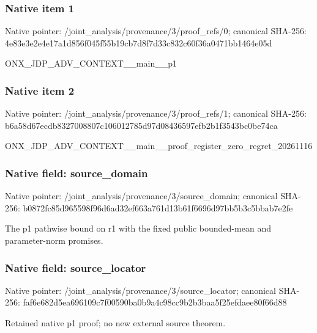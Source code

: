 \documentclass[10pt,a4paper]{article}
\begin{document}
\subsubsection{Native item 1}
Native pointer: /joint\_\allowbreak{}analysis/provenance/3/proof\_\allowbreak{}refs/0; canonical SHA-256: 4e83e3e2e4e17a1d856f045f55b19cb7d8f7d33c832c60f36a0471bb1464e05d

\begingroup\raggedright\sloppy ONX\_\allowbreak{}JDP\_\allowbreak{}ADV\_\allowbreak{}CONTEXT\_\allowbreak{}\_\allowbreak{}main\_\allowbreak{}\_\allowbreak{}p1\par\endgroup

\subsubsection{Native item 2}
Native pointer: /joint\_\allowbreak{}analysis/provenance/3/proof\_\allowbreak{}refs/1; canonical SHA-256: b6a58d67ecdb8327008807c106012785d97d08436597efb2b1f3543bc0be74ca

\begingroup\raggedright\sloppy ONX\_\allowbreak{}JDP\_\allowbreak{}ADV\_\allowbreak{}CONTEXT\_\allowbreak{}\_\allowbreak{}main\_\allowbreak{}\_\allowbreak{}proof\_\allowbreak{}register\_\allowbreak{}zero\_\allowbreak{}regret\_\allowbreak{}20261116\par\endgroup

\subsubsection{Native field: source\_\allowbreak{}domain}
Native pointer: /joint\_\allowbreak{}analysis/provenance/3/source\_\allowbreak{}domain; canonical SHA-256: b0872fc85d965598f96d6ad32ef663a761d13b61f6696d97bb5b3c5bbab7e2fe

\begingroup\raggedright\sloppy The p1 pathwise bound on r1 with the fixed public bounded-mean and parameter-norm promises.\par\endgroup

\subsubsection{Native field: source\_\allowbreak{}locator}
Native pointer: /joint\_\allowbreak{}analysis/provenance/3/source\_\allowbreak{}locator; canonical SHA-256: faf6e682d5ea696109c7f00590ba0b9a4c98cc9b2b3baa5f25efdaee80f66d88

\begingroup\raggedright\sloppy Retained native p1 proof;\allowbreak{} no new external source theorem.\par\endgroup
\end{document}
